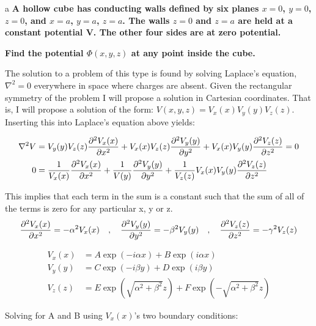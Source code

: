 \begin{homeworkProblem}

\begin{homeworkSection}{a}
\textbf{A hollow cube has conducting walls defined by six planes $x = 0$, $y = 0$, $z = 0$, and 
$x = a$, $y = a$, $z = a$. The walls $z = 0$ and $z = a$ are held at a constant potential V. 
The other four sides are at zero potential.}

\textbf{Find the potential $\Phi(x, y, z)$ at any point inside the cube.}

The solution to a problem of this type is found by solving Laplace's equation, $\nabla^2 = 0$ everywhere in space where charges are absent. Given the rectangular symmetry of the problem I will propose a solution in Cartesian coordinates. That is, I will propose a solution of the form: $V(x,y,z) = V_x(x)V_y(y)V_z(z)$. Inserting this into Laplace's equation above yields:

\begin{align}
\nabla^2 V &= V_y(y)V_z(z)\dfrac{\partial^2 {V_x(x)}}{\partial {x}^2} + V_x(x)V_z(z)\dfrac{\partial^2 {V_y(y)}}{\partial {y}^2} + V_x(x)V_y(y)\dfrac{\partial^2 {V_z(z)}}{\partial {z}^2} = 0 \nonumber \\
0 &= \dfrac{1}{V_x(x)}\dfrac{\partial^2 {V_x(x)}}{\partial {x}^2} + \dfrac{1}{V(y)}\dfrac{\partial^2 {V_y(y)}}{\partial {y}^2} + \dfrac{1}{V_z(z)}V_x(x)V_y(y)\dfrac{\partial^2 {V_z(z)}}{\partial {z}^2} \nonumber
\end{align}

This implies that each term in the sum is a constant such that the sum of all of the terms is zero for any particular x, y or z.
\[
\dfrac{\partial^2 {V_x(x)}}{\partial {x}^2} = -\alpha^2 V_x(x) \quad,\quad \dfrac{\partial^2 {V_y(y)}}{\partial {y}^2} = -\beta^2 V_y(y) \quad,\quad \dfrac{\partial^2 {V_z(z)}}{\partial {z}^2} = -\gamma^2 V_z(z) \nonumber
\]

\begin{align}
V_x(x) &= A \exp(-i \alpha x) + B \exp(i \alpha x) \nonumber \\
V_y(y) &= C \exp(-i \beta y) + D \exp(i \beta y) \nonumber \\
V_z(z) &= E \exp(\sqrt{\alpha^2+\beta^2} z) + F \exp(-\sqrt{\alpha^2+\beta^2} z) \nonumber
\end{align}

Solving for A and B using $V_x(x)$'s two boundary conditions:


\end{homeworkSection}
\end{homeworkProblem}
